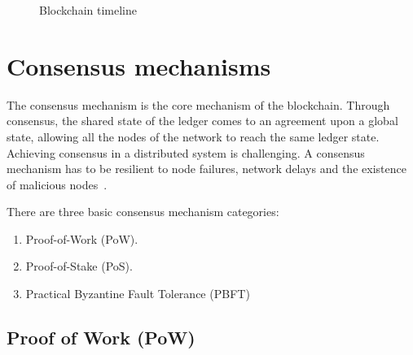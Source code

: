 \begin{figure}[ht!]
  \caption{Blockchain timeline}
  \label{fig:blockchain_timeline}
\end{figure}

\section{Consensus mechanisms}\label{blockchain:consensus_mechanisms}

The consensus mechanism is the core mechanism of the blockchain. Through consensus, the shared state of the ledger comes to an agreement upon a global state,
allowing all the nodes of the network to reach the same ledger state. Achieving consensus in a distributed system is challenging.
A consensus mechanism has to be resilient to node failures, network delays and the existence of malicious nodes~\cite{wiki:byzantine_fault_tolerance}.

There are three basic consensus mechanism categories:

\begin{enumerate}
  \item Proof-of-Work (PoW).
  \item Proof-of-Stake (PoS).
  \item Practical Byzantine Fault Tolerance (PBFT)
\end{enumerate}


\subsection{Proof of Work (PoW)}\label{blockchain:consensus:pow}

